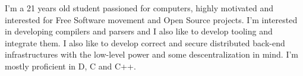 

\begin{cvparagraph}

I'm a 21 years old student passioned for computers, highly motivated and
	interested for Free Software movement and Open Source projects. I'm
	interested in developing compilers and parsers and I also like to
	develop tooling and integrate them. I also like to develop correct and
	secure distributed back-end infrastructures with the low-level power
	and some descentralization in mind. I'm mostly proficient in D, C and
	C++.

\end{cvparagraph}
